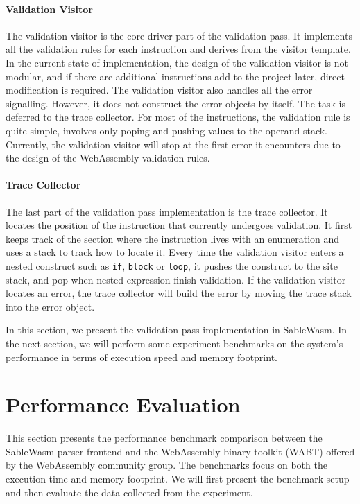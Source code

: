 \paragraph{Validation Visitor}
The validation visitor is the core driver part of the validation pass. It implements all the validation rules for each instruction and derives from the visitor template. In the current state of implementation, the design of the validation visitor is not modular, and if there are additional instructions add to the project later, direct modification is required. The validation visitor also handles all the error signalling. However, it does not construct the error objects by itself. The task is deferred to the trace collector. For most of the instructions, the validation rule is quite simple, involves only poping and pushing values to the operand stack. Currently, the validation visitor will stop at the first error it encounters due to the design of the WebAssembly validation rules. 

\paragraph{Trace Collector}
The last part of the validation pass implementation is the trace collector. It locates the position of the instruction that currently undergoes validation. It first keeps track of the section where the instruction lives with an enumeration and uses a stack to track how to locate it. Every time the validation visitor enters a nested construct such as \texttt{if}, \texttt{block} or \texttt{loop}, it pushes the construct to the site stack, and pop when nested expression finish validation. If the validation visitor locates an error, the trace collector will build the error by moving the trace stack into the error object.

In this section, we present the validation pass implementation in SableWasm. In the next section, we will perform some experiment benchmarks on the system's performance in terms of execution speed and memory footprint. 

\section{Performance Evaluation}

This section presents the performance benchmark comparison between the SableWasm parser frontend and the WebAssembly binary toolkit (WABT) offered by the WebAssembly community group. The benchmarks focus on both the execution time and memory footprint. We will first present the benchmark setup and then evaluate the data collected from the experiment. 

